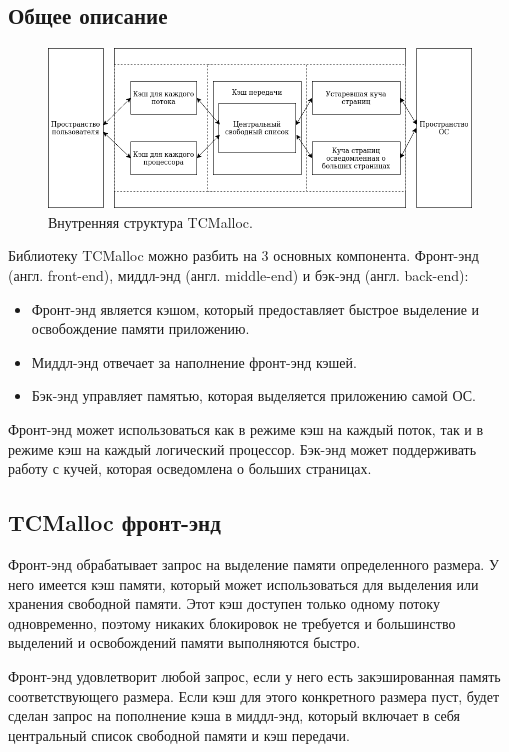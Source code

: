 \subsection{Общее описание}
\begin{figure}[!h]
	\begin{center}
		\includegraphics[scale=0.6]{images/tcmalloc-overview.png}
		\caption{Внутренняя структура TCMalloc.}
		\label{tcmalloc-overview}
	\end{center}
\end{figure}

Библиотеку TCMalloc можно разбить на 3 основных компонента. Фронт-энд (англ. front-end), миддл-энд (англ. middle-end) и бэк-энд (англ. back-end):
\begin{itemize}
	\item Фронт-энд является кэшом, который предоставляет быстрое выделение и освобождение памяти приложению.
	\item Миддл-энд отвечает за наполнение фронт-энд кэшей.
	\item Бэк-энд управляет памятью, которая выделяется приложению самой ОС.
\end{itemize}

Фронт-энд может использоваться как в режиме кэш на каждый поток, так и в режиме кэш на каждый логический процессор. Бэк-энд может поддерживать работу с кучей, которая осведомлена о больших страницах.

\subsection{TCMalloc фронт-энд}
Фронт-энд обрабатывает запрос на выделение памяти определенного размера. У него имеется кэш памяти, который может использоваться для выделения или хранения свободной памяти. Этот кэш доступен только одному потоку одновременно, поэтому никаких блокировок не требуется и большинство выделений и освобождений памяти выполняются быстро.

Фронт-энд удовлетворит любой запрос, если у него есть закэшированная память соответствующего размера. Если кэш для этого конкретного размера пуст, будет сделан запрос на пополнение кэша в миддл-энд, который включает в себя центральный список свободной памяти и кэш передачи.

